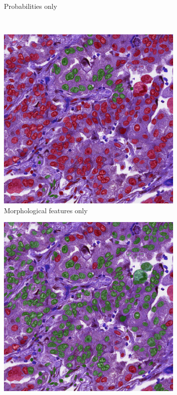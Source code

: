 \begin{figure}[H]
\begin{subfigure}[b]{0.45\textwidth}
    \caption{Probabilities only}
    \label{fig:monusac-no-morph3}
  \end{subfigure}
  \\
  \begin{subfigure}[b]{0.45\textwidth}
    \includegraphics[width=\textwidth]{imgs/qual/monusac/no-prior3.png}
    \caption{Morphological features only}
    \label{fig:monusac-no-prior3}
  \end{subfigure}
  \hfill
  \begin{subfigure}[b]{0.45\textwidth}
    \includegraphics[width=\textwidth]{imgs/qual/monusac/void3.png}

\end{subfigure}
\end{figure}
